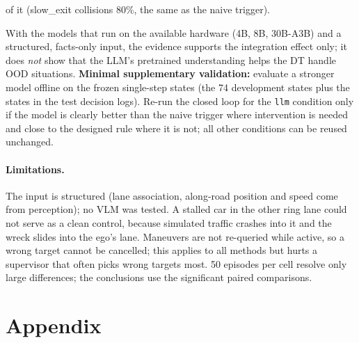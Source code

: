\documentclass[11pt]{article}
\newenvironment{revblock}{\color{red}}{}
\begin{document}
\begin{revblock}
\begin{enumerate}[nosep]
  of it (slow\_exit collisions 80\%, the same as the naive trigger).
\end{enumerate}
With the models that run on the available hardware (4B, 8B, 30B-A3B) and a structured, facts-only input, the evidence
supports the integration effect only; it does \emph{not} show that the LLM's pretrained understanding helps the DT handle
OOD situations. \textbf{Minimal supplementary validation:} evaluate a stronger model offline on the frozen single-step
states (the 74 development states plus the states in the test decision logs). Re-run the closed loop for the
\texttt{llm} condition only if the model is clearly better than the naive trigger where intervention is needed and
close to the designed rule where it is not; all other conditions can be reused unchanged.

\paragraph{Limitations.} The input is structured (lane association, along-road position and speed come from perception);
no VLM was tested. A stalled car in the other ring lane could not serve as a clean control, because simulated traffic
crashes into it and the wreck slides into the ego's lane. Maneuvers are not re-queried while active, so a wrong target
cannot be cancelled; this applies to all methods but hurts a supervisor that often picks wrong targets most.
50 episodes per cell resolve only large differences; the conclusions use the significant paired comparisons.
\end{revblock}

\appendix
\section*{Appendix}
\end{document}
